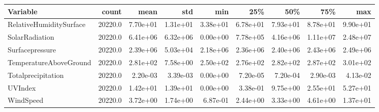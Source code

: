 \begin{tabular}{lrrrrrrrr}
\toprule
Variable &    count &          mean &           std &           min &           25\% &           50\% &           75\% &           max \\
\midrule
RelativeHumiditySurface &  20220.0 &  7.70e+01 &  1.31e+01 &  3.38e+01 &  6.78e+01 &  7.93e+01 &  8.78e+01 &  9.90e+01 \\
SolarRadiation          &  20220.0 &  6.41e+06 &  6.32e+06 &  0.00e+00 &  7.78e+05 &  4.16e+06 &  1.11e+07 &  2.48e+07 \\
Surfacepressure         &  20220.0 &  2.39e+06 &  5.03e+04 &  2.18e+06 &  2.36e+06 &  2.40e+06 &  2.43e+06 &  2.49e+06 \\
TemperatureAboveGround  &  20220.0 &  2.81e+02 &  7.58e+00 &  2.50e+02 &  2.76e+02 &  2.82e+02 &  2.87e+02 &  3.01e+02 \\
Totalprecipitation      &  20220.0 &  2.20e-03 &  3.39e-03 &  0.00e+00 &  7.20e-05 &  7.20e-04 &  2.90e-03 &  4.13e-02 \\
UVIndex                 &  20220.0 &  1.42e+01 &  1.39e+01 &  0.00e+00 &  3.38e-01 &  9.75e+00 &  2.55e+01 &  5.27e+01 \\
WindSpeed               &  20220.0 &  3.72e+00 &  1.74e+00 &  6.87e-01 &  2.44e+00 &  3.33e+00 &  4.61e+00 &  1.37e+01 \\
\bottomrule
\end{tabular}
